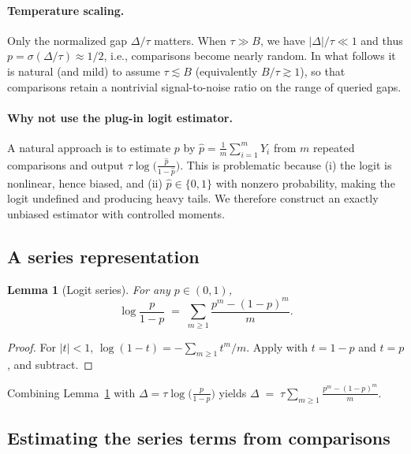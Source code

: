 \documentclass[11pt]{article}
\theoremstyle{plain}
\newtheorem{lemma}[theorem]{Lemma}
\theoremstyle{remark}
\newcommand{\1}{\mathbf{1}}
\begin{document}
\paragraph{Temperature scaling.}
Only the normalized gap $\Delta/\tau$ matters. When $\tau\gg B$, we have $|\Delta|/\tau\ll 1$ and thus
$p=\sigma(\Delta/\tau)\approx 1/2$, i.e., comparisons become nearly random.
In what follows it is natural (and mild) to assume $\tau\lesssim B$ (equivalently $B/\tau\gtrsim 1$),
so that comparisons retain a nontrivial signal-to-noise ratio on the range of queried gaps.

\paragraph{Why not use the plug-in logit estimator.}
A natural approach is to estimate $p$ by $\hat p=\frac{1}{m}\sum_{i=1}^m Y_i$ from $m$ repeated comparisons and output
$\tau\log\!\big(\frac{\hat p}{1-\hat p}\big)$. This is problematic because (i) the logit is nonlinear, hence biased,
and (ii) $\hat p\in\{0,1\}$ with nonzero probability, making the logit undefined and producing heavy tails.
We therefore construct an exactly unbiased estimator with controlled moments.

\subsection{A series representation}

\begin{propbox}
\begin{lemma}[Logit series]\label{lem:series}
For any $p\in(0,1)$,
\[
\log\frac{p}{1-p}
\;=\;
\sum_{m\ge 1}\frac{p^m-(1-p)^m}{m}.
\]
\end{lemma}
\end{propbox}

\begin{proof}
For $|t|<1$, $\log(1-t)=-\sum_{m\ge1} t^m/m$.
Apply with $t=1-p$ and $t=p$, and subtract.
\end{proof}

Combining Lemma~\ref{lem:series} with $\Delta=\tau\log\!\big(\frac{p}{1-p}\big)$ yields
$
\Delta
\;=\;
\tau \sum_{m\ge1}\frac{p^m-(1-p)^m}{m}.
$

\subsection{Estimating the series terms from comparisons}
\end{document}
